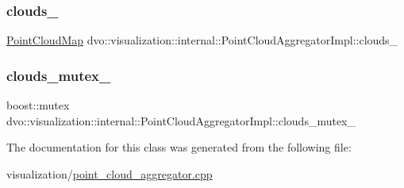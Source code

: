 \subsubsection{\texorpdfstring{clouds\+\_\+}{clouds\_}}
{\footnotesize\ttfamily \mbox{\hyperlink{namespacedvo_1_1visualization_a6bfc209b639de1fc1fb54582af7292f7}{Point\+Cloud\+Map}} dvo\+::visualization\+::internal\+::\+Point\+Cloud\+Aggregator\+Impl\+::clouds\+\_\+}

\mbox{\label{classdvo_1_1visualization_1_1internal_1_1_point_cloud_aggregator_impl_a1b959ce567fa43e695eab5c33b56ab4f}} 
\subsubsection{\texorpdfstring{clouds\+\_\+mutex\+\_\+}{clouds\_mutex\_}}
{\footnotesize\ttfamily boost\+::mutex dvo\+::visualization\+::internal\+::\+Point\+Cloud\+Aggregator\+Impl\+::clouds\+\_\+mutex\+\_\+}



The documentation for this class was generated from the following file\+:\begin{DoxyCompactItemize}
\item 
visualization/\mbox{\hyperlink{point__cloud__aggregator_8cpp}{point\+\_\+cloud\+\_\+aggregator.\+cpp}}\end{DoxyCompactItemize}
